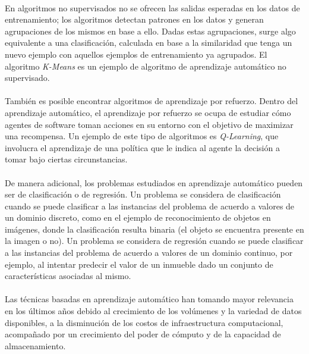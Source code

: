 \newpage %

\paragraph{} En algoritmos no supervisados no se ofrecen las salidas esperadas en los datos de entrenamiento; los algoritmos detectan patrones en los datos y generan agrupaciones de los mismos en base a ello.
Dadas estas agrupaciones, surge algo equivalente a una clasificación, calculada en base a la similaridad que tenga un nuevo ejemplo con aquellos ejemplos de entrenamiento ya agrupados.
El algoritmo \textit{K-Means} es un ejemplo de algoritmo de aprendizaje automático no supervisado. 

\paragraph{}También es posible encontrar algoritmos de aprendizaje por refuerzo.
Dentro del aprendizaje automático, el aprendizaje por refuerzo se ocupa de estudiar cómo agentes de software toman acciones en su entorno con el objetivo de maximizar una recompensa.
Un ejemplo de este tipo de algoritmos es \textit{Q-Learning}, que involucra el aprendizaje de una política que le indica al agente la decisión a tomar bajo ciertas circunstancias.

\paragraph{}De manera adicional, los problemas estudiados en aprendizaje automático pueden ser de clasificación o de regresión.
Un problema se considera de clasificación cuando se puede clasificar a las instancias del problema de acuerdo a valores de un dominio discreto, como en el ejemplo de reconocimiento de objetos en imágenes, donde la clasificación resulta binaria (el objeto se encuentra presente en la imagen o no).
Un problema se considera de regresión cuando se puede clasificar a las instancias del problema de acuerdo a valores de un dominio continuo, por ejemplo, al intentar predecir el valor de un inmueble dado un conjunto de características asociadas al mismo.

\paragraph{}Las técnicas basadas en aprendizaje automático han tomando mayor relevancia en los últimos años debido al crecimiento de los volúmenes y la variedad de datos disponibles, a la disminución de los costos de infraestructura computacional, acompañado por un crecimiento del poder de cómputo y de la capacidad de almacenamiento.

